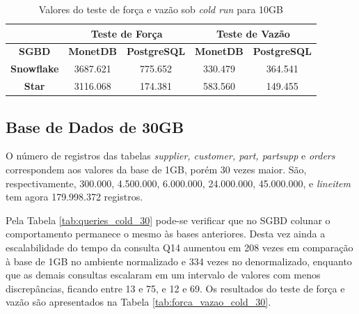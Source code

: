 \begin{table}[htpb]
        \centering
        \caption{Valores do teste de força e vazão sob \textit{cold run} para 10GB}
        \label{tab:forca_vazao_cold_10}
        \begin{tabular}{|c|c|c|c|c|} 
                \cline{2-5}
                \multicolumn{1}{c|}{} & \multicolumn{2}{c|}{\textbf{Teste de Força} } & \multicolumn{2}{c|}{\textbf{Teste de Vazão} }  \\ 
                \hline
                 \textbf{SGBD}        & \textbf{MonetDB}  & \textbf{PostgreSQL}       & \textbf{MonetDB}  & \textbf{PostgreSQL}        \\ 
                \hline
                 \textbf{Snowflake}   & 3687.621          & 775.652                   & 330.479           & 364.541                    \\ 
                \hline
                 \textbf{Star}        & 3116.068          & 174.381                   & 583.560           & 149.455                    \\
                \hline
                \end{tabular}
                \end{table}

\subsection{Base de Dados de 30GB}

O número de registros das tabelas \textit{supplier, customer, part, partsupp} e \textit{orders} correspondem aos valores da base de 1GB, porém 30 vezes maior. São, respectivamente, 300.000, 4.500.000, 6.000.000, 24.000.000, 45.000.000, e \textit{lineitem} tem agora 179.998.372 registros.

Pela Tabela \ref{tab:queries_cold_30} pode-se verificar que no SGBD colunar o comportamento permanece o mesmo às bases anteriores. Desta vez ainda a escalabilidade do tempo da consulta Q14 aumentou em 208 vezes em comparação à base de 1GB no ambiente normalizado e 334 vezes no denormalizado, enquanto que as demais consultas escalaram em um intervalo de valores com menos discrepâncias, ficando entre 13 e 75, e 12 e 69. Os resultados do teste de força e vazão são apresentados na Tabela \ref{tab:forca_vazao_cold_30}.

